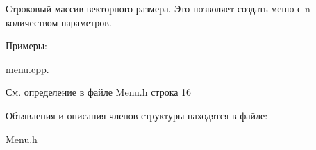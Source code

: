 Строковый массив векторного размера. Это позволяет создать меню с n количеством параметров. 

\begin{Desc}
\item[Примеры\+: ]\par
\hyperlink{menu_8cpp-example}{menu.\+cpp}.\end{Desc}


См. определение в файле Menu.\+h строка 16



Объявления и описания членов структуры находятся в файле\+:\begin{DoxyCompactItemize}
\item 
\hyperlink{_menu_8h}{Menu.\+h}\end{DoxyCompactItemize}
